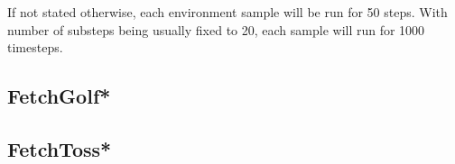 If not stated otherwise, each environment sample will be run for 50 steps. With number of substeps being usually fixed to 20, each sample will run for 1000 timesteps.



\subsection{FetchGolf*}



\subsection{FetchToss*}